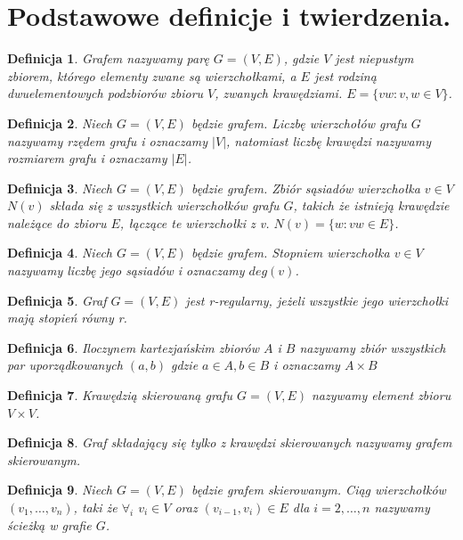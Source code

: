 \documentclass[12pt,a4paper]{article}
\newtheorem{df}{Definicja}[section]
\begin{document}
\section{Podstawowe definicje i twierdzenia.}
\begin{df} 
Grafem nazywamy par\k{e} $G=(V,E)$, gdzie $V$ jest niepustym zbiorem, kt\'orego elementy zwane s\k{a} wierzcho{\l}kami, a $E$ jest rodzin\k{a} dwuelementowych podzbior\'ow zbioru $V$, zwanych kraw\k{e}dziami.
$E=\{vw : v,w\in V \}$.
\end{df}
\begin{df} 
Niech $G=(V,E)$ b\k{e}dzie grafem. Liczb\k{e} wierzcho{\l}\'ow grafu $G$ nazywamy rz\k{e}dem grafu i oznaczamy $|V|$, natomiast liczb\k{e} kraw\k{e}dzi nazywamy rozmiarem grafu i oznaczamy $|E|$.
\end{df}
\begin{df} 
Niech $G=(V,E)$ b\k{e}dzie grafem. Zbi\'or s\k{a}siad\'ow wierzcho{\l}ka $v\in V$ $N(v)$ sk{\l}ada si\k{e} z wszystkich wierzcho{\l}k\'ow grafu $G$, takich \.ze istniej\k{a} kraw\k{e}dzie nale\.z\k{a}ce do zbioru $E$, {\l}\k{a}cz\k{a}ce te wierzcho{\l}ki z v. $N(v)=\{w : vw\in E\}$.
\end{df} 
\begin{df} 
Niech $G=(V,E)$ b\k{e}dzie grafem. Stopniem wierzcho{\l}ka $v\in V$ nazywamy liczb\k{e} jego s\k{a}siad\'ow i oznaczamy $deg(v)$.
\end{df}
\begin{df} 
Graf $G=(V,E)$ jest r-regularny, je\.zeli wszystkie jego wierzcho{\l}ki maj\k{a} stopie\'n r\'owny r.
\end{df} 
\begin{df} 
Iloczynem kartezja\'nskim zbior\'ow $A$ i $B$ nazywamy zbi\'or wszystkich par uporz\k{a}dkowanych $(a,b)$ gdzie $a\in A, b\in B$ i oznaczamy $A\times B$ 
\end{df}
\begin{df} 
Kraw\k{e}dzi\k{a} skierowan\k{a} grafu $G=(V,E)$ nazywamy element zbioru $V\times V$.
\end{df}
\begin{df} 
Graf sk{\l}adaj\k{a}cy si\k{e} tylko z kraw\k{e}dzi skierowanych nazywamy grafem skierowanym.
\end{df}
\begin{df} 
Niech $G=(V,E)$ b\k{e}dzie grafem skierowanym. Ci\k{a}g wierzcho{\l}k\'ow $(v_{1}, \ldots, v_{n})$, taki \.ze $\forall_{i}$ $v_{i}\in V$ oraz  $(v_{i-1}, v_{i}) \in E$ dla $i=2, \ldots, n$ nazywamy \'scie\.zk\k{a} w grafie $G$.
\end{df} 
\end{document}
